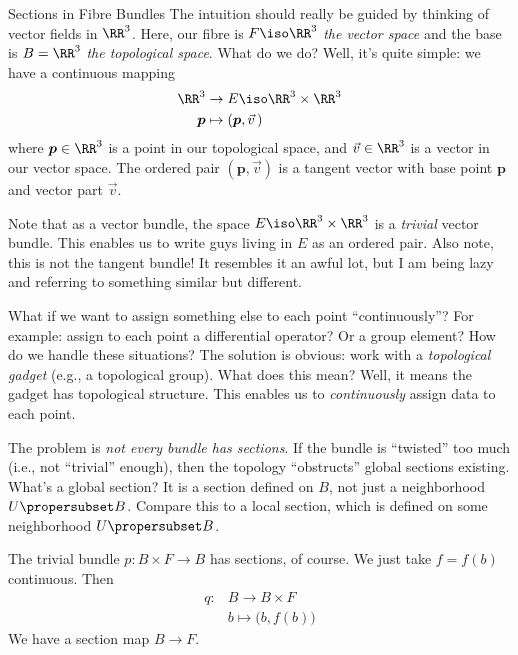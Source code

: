 \begin{Boxed}{Sections in Fibre Bundles}
The intuition should really be guided by thinking of vector
fields in $\RR^3$. Here, our fibre is $F\iso\RR^3$ \emph{the vector space}
and the base is $B=\RR^3$ \emph{the topological space}. What do
we do? Well, it's quite simple: we have a continuous mapping
\begin{equation}
\begin{split}
\RR^{3}&\to E\iso\RR^{3}\times\RR^{3}\\
\boldsymbol{p}&\mapsto(\boldsymbol{p},\vec{v}\,)
\end{split}
\end{equation}
where $\boldsymbol{p}\in\RR^3$ is a point in our topological
space, and $\vec{v}\in\RR^3$ is a vector in our vector space. The
ordered pair $(\boldsymbol{p},\vec{v})$ is a tangent vector with
base point $\boldsymbol{p}$ and vector part $\vec{v}$.

\begin{ddanger}
Note that as a vector bundle, the space $E\iso\RR^3\times\RR^3$
is a \emph{trivial} vector bundle. This enables us to write guys
living in $E$ as an ordered pair. Also note, this is not the
tangent bundle! It resembles it an awful lot, but I am being
lazy and referring to something similar but different.
\end{ddanger}

What if we want to assign something else to each point
``continuously''? For example: assign to each point a
differential operator? Or a group element? How do we handle these
situations? The solution is obvious: work with a
\emph{topological gadget} (e.g., a topological group). What does
this mean? Well, it means the gadget has topological
structure. This enables us to \emph{continuously} assign data to
each point. 

The problem is \emph{not every bundle has sections}. If the
bundle is ``twisted'' too much (i.e., not ``trivial'' enough),
then the topology ``obstructs'' global sections existing. What's
a global section? It is a section defined on $B$, not just a
neighborhood $U\propersubset B$. Compare this to a local section,
which is defined on some neighborhood $U\propersubset B$.
\end{Boxed}
The trivial bundle $p\colon B\times F\to B$ has sections, of
course. We just take $f=f(b)$ continuous. Then
\begin{equation}
\begin{split}
q\colon&B\to B\times F\\
&b\mapsto\bigl(b,f(b)\bigr)
\end{split}
\end{equation}
We have a section map $B\to F$.

